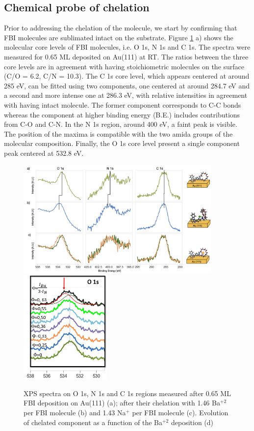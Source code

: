 \documentclass[aps,prl,reprint,longbibliography,superscriptaddress]{revtex4-1}
\def\Ba{Ba$^{+2}$ }
\def\Na{Na$^{+}$ }
\begin{document}
\subsection{Chemical probe of chelation}
Prior to addressing the chelation of the molecule, we start by confirming that FBI molecules are sublimated intact on the substrate. Figure \ref{XPS_FBI_Au(111)} a) shows the molecular core levels of FBI molecules, i.e. O 1s, N 1s and C 1s. The spectra were measured for 0.65 ML deposited on Au(111) at RT. The ratios between the three core levels are in agreement with having stoichiometric molecules on the surface (C/O = 6.2, C/N = 10.3). The C 1s core level, which appears centered at around 285 eV, can be fitted using two components, one centered at around 284.7 eV and a second and more intense one at 286.3 eV, with relative intensities in agreement with having intact molecule. The former component corresponds to C-C bonds whereas the component at higher binding energy (B.E.) includes contributions from C-O and C-N. In the N 1s region, around 400 eV, a faint peak is visible. The position of the maxima is compatible with the two amida groups of the molecular composition. Finally, the O 1s core level present a single component peak centered at 532.8 eV.

\begin{figure}[ht!]
	\includegraphics[width=0.9\textwidth]{figures/fig2_xps_chelation.a).png}
	\includegraphics[width=0.4\textwidth]{figures/XPS_O1s_evolution_Au.png}
	
	\caption{\label{XPS_FBI_Au(111)} 
    XPS spectra on O 1s, N 1s and C 1s regions measured after 0.65 ML FBI deposition on Au(111) (a); after their chelation with 1.46 \Ba per FBI molecule (b) and 1.43 \Na per FBI molecule (c). Evolution of chelated component as a function of the \Ba deposition (d)}
\end{figure}  
\end{document}
